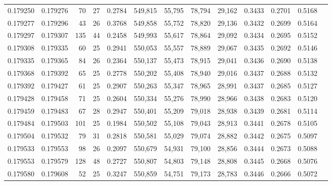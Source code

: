 \begin{tabular}{rrrrrrrrrrrrr}
0.179250 & 0.179276 &  70 &  27 &                                     0.2784 & 549,815 &  55,795 &  78,794 &  29,162 & 0.3433 & 0.2701 & 0.5168 \\
0.179277 & 0.179296 &  43 &  26 &                                     0.3768 & 549,858 &  55,752 &  78,820 &  29,136 & 0.3432 & 0.2699 & 0.5164 \\
0.179297 & 0.179307 & 135 &  44 &                                     0.2458 & 549,993 &  55,617 &  78,864 &  29,092 & 0.3434 & 0.2695 & 0.5152 \\
0.179308 & 0.179335 &  60 &  25 &                                     0.2941 & 550,053 &  55,557 &  78,889 &  29,067 & 0.3435 & 0.2692 & 0.5146 \\
0.179335 & 0.179365 &  84 &  26 &                                     0.2364 & 550,137 &  55,473 &  78,915 &  29,041 & 0.3436 & 0.2690 & 0.5138 \\
0.179368 & 0.179392 &  65 &  25 &                                     0.2778 & 550,202 &  55,408 &  78,940 &  29,016 & 0.3437 & 0.2688 & 0.5132 \\
0.179392 & 0.179427 &  61 &  25 &                                     0.2907 & 550,263 &  55,347 &  78,965 &  28,991 & 0.3437 & 0.2685 & 0.5127 \\
0.179428 & 0.179458 &  71 &  25 &                                     0.2604 & 550,334 &  55,276 &  78,990 &  28,966 & 0.3438 & 0.2683 & 0.5120 \\
0.179459 & 0.179483 &  67 &  28 &                                     0.2947 & 550,401 &  55,209 &  79,018 &  28,938 & 0.3439 & 0.2681 & 0.5114 \\
0.179484 & 0.179503 & 101 &  25 &                                     0.1984 & 550,502 &  55,108 &  79,043 &  28,913 & 0.3441 & 0.2678 & 0.5105 \\
0.179504 & 0.179532 &  79 &  31 &                                     0.2818 & 550,581 &  55,029 &  79,074 &  28,882 & 0.3442 & 0.2675 & 0.5097 \\
0.179533 & 0.179553 &  98 &  26 &                                     0.2097 & 550,679 &  54,931 &  79,100 &  28,856 & 0.3444 & 0.2673 & 0.5088 \\
0.179553 & 0.179579 & 128 &  48 &                                     0.2727 & 550,807 &  54,803 &  79,148 &  28,808 & 0.3445 & 0.2668 & 0.5076 \\
0.179580 & 0.179608 &  52 &  25 &                                     0.3247 & 550,859 &  54,751 &  79,173 &  28,783 & 0.3446 & 0.2666 & 0.5072 \\

\end{tabular}
